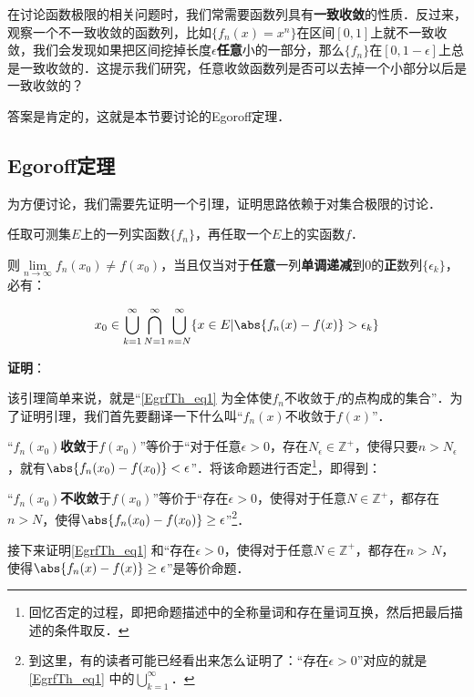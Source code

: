 
在讨论函数极限的相关问题时，我们常需要函数列具有\textbf{一致收敛}的性质．反过来，观察一个不一致收敛的函数列，比如$\{f_n(x)=x^n\}$在区间$[0, 1]$上就不一致收敛，我们会发现如果把区间挖掉长度$\epsilon$\textbf{任意}小的一部分，那么$\{f_n\}$在$[0, 1-\epsilon]$上总是一致收敛的．这提示我们研究，任意收敛函数列是否可以去掉一个小部分以后是一致收敛的？

答案是肯定的，这就是本节要讨论的Egoroff定理．

\subsection{Egoroff定理}

为方便讨论，我们需要先证明一个引理，证明思路依赖于对集合极限的讨论．

\begin{lemma}{}
任取可测集$E$上的一列实函数$\{f_n\}$，再任取一个$E$上的实函数$f$．

则$\lim\limits_{n\to\infty}f_n(x_0)\neq f(x_0)$，当且仅当对于\textbf{任意}一列\textbf{单调递减}到$0$的\textbf{正}数列$\{\epsilon_k\}$，必有：

\begin{equation}\label{EgrfTh_eq1}
x_0\in\bigcup^\infty_{k=1}\bigcap^\infty_{N=1}\bigcup^\infty_{n=N} \{x\in E|\abs{f_n(x)-f(x)}>\epsilon_k\}
\end{equation}

\end{lemma}

\textbf{证明}：

该引理简单来说，就是“\autoref{EgrfTh_eq1} 为全体使$f_n$不收敛于$f$的点构成的集合”．为了证明引理，我们首先要翻译一下什么叫“$f_n(x)$不收敛于$f(x)$”．

“$f_n(x_0)$\textbf{收敛}于$f(x_0)$”等价于“对于任意$\epsilon>0$，存在$N_\epsilon\in\mathbb{Z}^+$，使得只要$n>N_\epsilon$，就有$\abs{f_n(x_0)-f(x_0)}<\epsilon$”．将该命题进行否定\footnote{回忆否定的过程，即把命题描述中的全称量词和存在量词互换，然后把最后描述的条件取反．}，即得到：

“$f_n(x_0)$\textbf{不收敛}于$f(x_0)$”等价于“存在$\epsilon>0$，使得对于任意$N\in\mathbb{Z}^+$，都存在$n>N$，使得$\abs{f_n(x_0)-f(x_0)}\geq\epsilon$”\footnote{到这里，有的读者可能已经看出来怎么证明了：“存在$\epsilon>0$”对应的就是\autoref{EgrfTh_eq1} 中的$\bigcup^\infty_{k=1}$．}．

接下来证明\autoref{EgrfTh_eq1} 和“存在$\epsilon>0$，使得对于任意$N\in\mathbb{Z}^+$，都存在$n>N$，使得$\abs{f_n(x)-f(x)}\geq\epsilon$”是等价命题．

